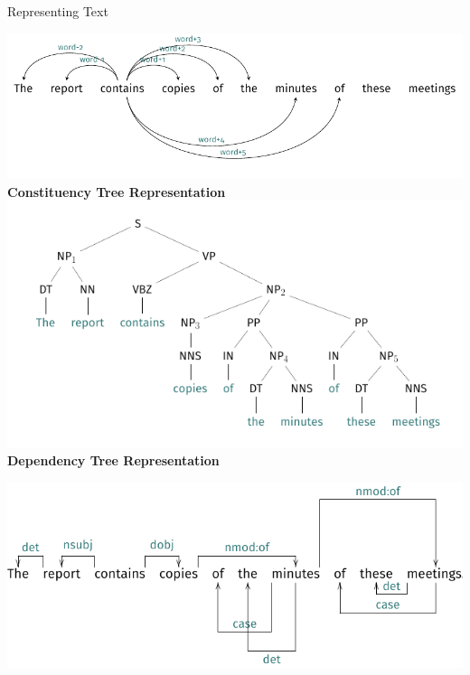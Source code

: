 \documentclass[10pt,=table]{beamer}
\begin{document}
\begin{frame}{Representing Text}
\begin{overprint}
      \includegraphics[width=.8\linewidth]{img/tree/lexical_tree.pdf}
	  \vfill
	  \vfill
  	  \centering
  	  \textbf{Constituency Tree Representation}
      \includegraphics[width=.65\linewidth]{img/tree/tree.pdf}
      \vfill
	  \vfill
	  \centering
   	  \textbf{Dependency Tree Representation}
   	  \vspace{.3cm}
      
      \includegraphics[width=.8\linewidth]{img/tree/dep_tree.pdf}
      \vfill
\end{overprint}
\end{frame}



%
\end{document}
